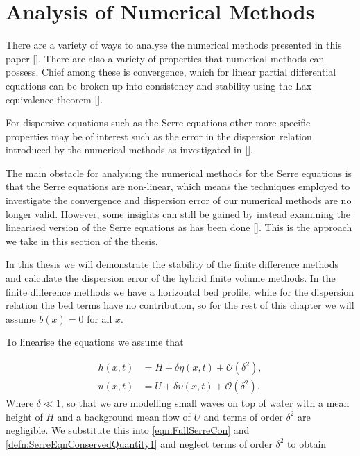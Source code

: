 
\chapter{Analysis of Numerical Methods}
\label{chp:AnalNumMethod}
There are a variety of ways to analyse the numerical methods presented in this paper []. There are also a variety of properties that numerical methods can possess. Chief among these is convergence, which for linear partial differential equations can be broken up into consistency and stability using the Lax equivalence theorem []. 


For dispersive equations such as the Serre equations other more specific properties may be of interest such as the error in the dispersion relation introduced by the numerical methods as investigated in []. 

The main obstacle for analysing the numerical methods for the Serre equations is that the Serre equations are non-linear, which means the techniques employed to investigate the convergence and dispersion error of our numerical methods are no longer valid. However, some insights can still be gained by instead examining the linearised version of the Serre equations as has been done []. This is the approach we take in this section of the thesis.

In this thesis we will demonstrate the stability of the finite difference methods and calculate the dispersion error of the hybrid finite volume methods. In the finite difference methods we have a horizontal bed profile, while for the dispersion relation the bed terms have no contribution, so for the rest of this chapter we will assume $b(x) = 0$ for all $x$.

To linearise the equations we assume that 

\begin{align}
\label{eq:pertubation}
h(x,t) &= H + \delta \eta(x,t) + \mathcal{O}\left(\delta^2 \right), \\
u(x,t) &= U + \delta \upsilon(x,t) + \mathcal{O}\left(\delta^2 \right).
\end{align}
Where $\delta \ll 1$, so that we are modelling small waves on top of water with a mean height of $H$ and a background mean flow of $U$ and terms of order $\delta^2$ are negligible. We substitute this into \eqref{eqn:FullSerreCon} and \eqref{defn:SerreEqnConservedQuantity1} and neglect terms of order $\delta^2$ to obtain

